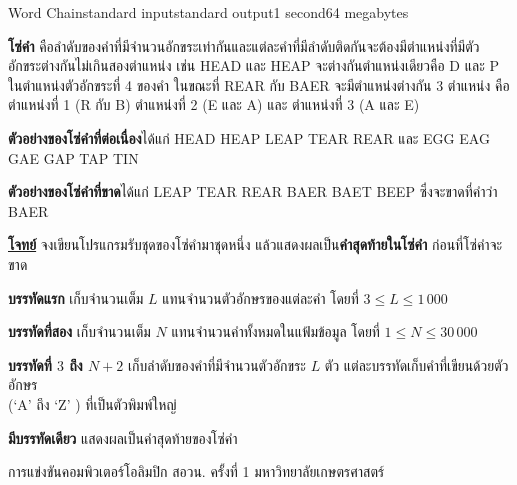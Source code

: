 \documentclass[11pt,a4paper]{article}
\begin{document}
\begin{problem}{Word Chain}{standard input}{standard output}{1 second}{64 megabytes}

\textbf{โซ่คำ} คือลำดับของคำที่มีจำนวนอักขระเท่ากันและแต่ละคำที่มีลำดับติดกันจะต้องมีตำแหน่งที่มีตัวอักขระต่างกันไม่เกินสองตำแหน่ง เช่น HEAD และ HEAP จะต่างกันตำแหน่งเดียวคือ D และ P ในตำแหน่งตัวอักขระที่ 4 ของคำ ในขณะที่ REAR กับ BAER จะมีตำแหน่งต่างกัน 3 ตำแหน่ง คือ ตำแหน่งที่ 1 (R กับ B) ตำแหน่งที่ 2 (E และ A) และ ตำแหน่งที่ 3 (A และ E)

\textbf{ตัวอย่างของโซ่คำที่ต่อเนื่อง}ได้แก่ HEAD HEAP LEAP TEAR REAR และ EGG EAG GAE GAP TAP TIN

\textbf{ตัวอย่างของโซ่คำที่ขาด}ได้แก่ LEAP TEAR REAR BAER BAET BEEP ซึ่งจะขาดที่คำว่า BAER

\underline{\textbf{โจทย์}} จงเขียนโปรแกรมรับชุดของโซ่คำมาชุดหนึ่ง แล้วแสดงผลเป็น\textbf{คำสุดท้ายในโซ่คำ }ก่อนที่โซ่คำจะขาด

\InputFile
\textbf{บรรทัดแรก} เก็บจำนวนเต็ม $L$ แทนจำนวนตัวอักษรของแต่ละคำ โดยที่ $3 \leq L \leq 1\,000$

\textbf{บรรทัดที่สอง} เก็บจำนวนเต็ม $N$ แทนจำนวนคำทั้งหมดในแฟ้มข้อมูล โดยที่ $1 \leq N \leq 30\,000$

\textbf{บรรทัดที่ $3$ ถึง $N +2$} เก็บลำดับของคำที่มีจำนวนตัวอักขระ $L$ ตัว แต่ละบรรทัดเก็บคำที่เขียนด้วยตัวอักษร \\ (‘A’ ถึง ‘Z’ ) ที่เป็นตัวพิมพ์ใหญ่

\OutputFile

\textbf{มีบรรทัดเดียว} แสดงผลเป็นคำสุดท้ายของโซ่คำ

\Examples

\begin{example}
%
\end{example}

\Source

การแข่งขันคอมพิวเตอร์โอลิมปิก สอวน. ครั้งที่ 1 มหาวิทยาลัยเกษตรศาสตร์

\end{problem}
\end{document}
